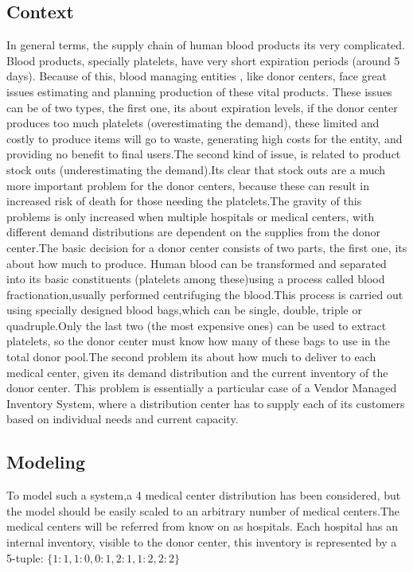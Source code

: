 \documentclass{elsarticle}
\begin{document}
	\subsection{Context}
		In general terms, the supply chain of human blood products its very complicated. Blood products, specially platelets, have very short expiration periods (around 5 days). Because of this, blood managing entities , like donor centers, face great issues estimating and planning production of these vital products. These issues can be of two types, the first one, its about expiration levels, if the donor center produces too much platelets (overestimating the demand), these limited and costly to produce items will go to waste, generating high costs for the entity, and providing no benefit to final users.The second kind of issue, is related to product stock outs (underestimating the demand).Its clear that stock outs are a much more important problem for the donor centers, because these can result in increased risk of death for those needing the platelets.The gravity of this problems is only increased when multiple hospitals or medical centers, with different demand distributions are dependent on the supplies from the donor center.The basic decision for a donor center consists of two parts, the first one, its about how much to produce. Human blood can be transformed and separated into its basic constituents (platelets among these)using a process called blood fractionation,usually performed centrifuging the blood.This process is carried out using specially designed blood bags,which can be single, double, triple or quadruple.Only the last two (the most expensive ones) can be used to extract platelets, so the donor center must know how many of these bags to use in the total donor pool.The second problem its about how much to deliver to each medical center, given its demand distribution and the current inventory of the donor center.
		This problem is essentially a particular case of a Vendor Managed Inventory System, where a distribution center has to supply each of its customers based on individual needs and current capacity.
		\subsection{Modeling}
		To model such a system,a 4 medical center distribution has been considered, but the model should be easily scaled to an arbitrary number of medical centers.The medical centers will be referred from know on as hospitals.
		Each hospital has an internal inventory, visible to the donor center, this inventory is represented by a 5-tuple:
		$\{1{:}1, 1{:}0, 0{:}1, 2:1, 1{:}2, 2{:}2\}$
		
\end{document}
